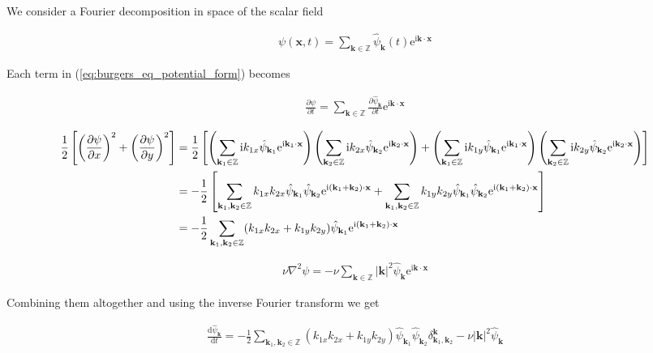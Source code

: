 \documentclass[9pt]{article}
\newcommand{\pder}[2]{\frac{\partial #1}{\partial #2}}               %
\newcommand{\psihat}[1]{\hat{\psi}_{#1}}      				          %
\newcommand{\ii}{\mathrm{i}}      								  %
\newcommand{\e}{\mathrm{e}}      								  %
\newcommand{\bfx}{\mathbf{x}}								%
\newcommand{\bfk}{\mathbf{k}}								%
\newcommand{\bfkn}[1]{\mathbf{k}_{#1}}								%
\begin{document}
We consider a Fourier decomposition in space of the scalar field 

\begin{align}
	\psi(\bfx, t) = \sum_{\bfk \in \mathbb{Z}} \psihat{\bfk}(t)\e^{\ii \bfk \cdot \bfx}
	\label{eq:fourier_decomp}
\end{align}

Each term in (\ref{eq:burgers_eq_potential_form}) becomes

\begin{align}
	\pder{\psi}{t} = \sum_{\bfk \in \mathbb{Z}} \pder{\psihat{\bfk}}{t} \e^{\ii \bfk \cdot \bfx}
\end{align}

\begin{align}
\frac{1}{2}\left[\left(\pder{\psi}{x}\right)^2 + \left(\pder{\psi}{y}\right)^2\right] &= \frac{1}{2} \left[ \left(\sum_{\bfkn{1} \in \mathbb{Z}}\ii k_{1x}\psihat{\bfkn{1}} \e^{\ii \bfkn{1} \cdot \bfx}\right)\left(\sum_{\bfkn{2} \in \mathbb{Z}}\ii k_{2x}\psihat{\bfkn{2}} \e^{\ii \bfkn{2} \cdot \bfx}\right) + \left(\sum_{\bfkn{1} \in \mathbb{Z}}\ii k_{1y}\psihat{\bfkn{1}} \e^{\ii \bfkn{1} \cdot \bfx}\right)\left(\sum_{\bfkn{2} \in \mathbb{Z}}\ii k_{2y}\psihat{\bfkn{2}} \e^{\ii \bfkn{2} \cdot \bfx}\right) \right] \notag \\ 
&= -\frac{1}{2}\left[\sum_{\bfkn{1}, \bfkn{2} \in \mathbb{Z}}k_{1x}k_{2x}\psihat{\bfkn{1}} \psihat{\bfkn{2}}\e^{\ii (\bfkn{1} + \bfkn{2}) \cdot \bfx}+\sum_{\bfkn{1}, \bfkn{2} \in \mathbb{Z}}k_{1y}k_{2y}\psihat{\bfkn{1}} \psihat{\bfkn{2}}\e^{\ii (\bfkn{1} + \bfkn{2}) \cdot \bfx} \right] \notag \\
&= -\frac{1}{2}\sum_{\bfkn{1}, \bfkn{2} \in \mathbb{Z}}(k_{1x}k_{2x} + k_{1y}k_{2y})\psihat{\bfkn{1}} \e^{\ii (\bfkn{1}+ \bfkn{2}) \cdot \bfx}
\end{align}

\begin{align}
\nu \nabla^2 \psi = -\nu\sum_{\bfk \in \mathbb{Z}} |\bfk|^2\psihat{\bfk} \e^{\ii \bfk \cdot \bfx}
\end{align}

Combining them altogether and using the inverse Fourier transform we get

\begin{align}
	\frac{\mathrm{d} \psihat{\bfk}}{\mathrm{d}t} = - \frac{1}{2} \sum_{\bfkn{1}, \bfkn{2} \in \mathbb{Z}}(k_{1x}k_{2x} + k_{1y}k_{2y})\psihat{\bfkn{1}} \psihat{\bfkn{2}} \delta_{\bfkn{1}, \bfkn{2}}^{\bfk} - \nu |\bfk|^2\psihat{\bfk}
	\label{eq:burgers_eq_pot_fourier_space}
\end{align}
\end{document}
